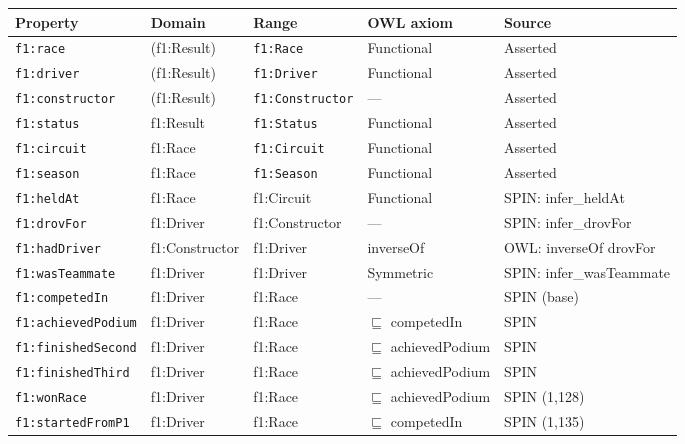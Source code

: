\begin{center}
\begin{tabularx}{\linewidth}{@{}lllp{2.2cm}X@{}}
\toprule
\textbf{Property} & \textbf{Domain} & \textbf{Range} & \textbf{OWL axiom} & \textbf{Source} \\
\midrule
\texttt{f1:race}       & (f1:Result) & \texttt{f1:Race}        & Functional & Asserted \\
\texttt{f1:driver}     & (f1:Result) & \texttt{f1:Driver}      & Functional & Asserted \\
\texttt{f1:constructor}& (f1:Result) & \texttt{f1:Constructor} & ---        & Asserted \\
\texttt{f1:status}     & f1:Result   & \texttt{f1:Status}      & Functional & Asserted \\
\texttt{f1:circuit}    & f1:Race     & \texttt{f1:Circuit}     & Functional & Asserted \\
\texttt{f1:season}     & f1:Race     & \texttt{f1:Season}      & Functional & Asserted \\
\midrule
\texttt{f1:heldAt}          & f1:Race        & f1:Circuit     & Functional        & SPIN: infer\_heldAt \\
\texttt{f1:drovFor}         & f1:Driver      & f1:Constructor & ---               & SPIN: infer\_drovFor \\
\texttt{f1:hadDriver}       & f1:Constructor & f1:Driver      & inverseOf         & OWL: inverseOf drovFor \\
\texttt{f1:wasTeammate}     & f1:Driver      & f1:Driver      & Symmetric         & SPIN: infer\_wasTeammate \\
\texttt{f1:competedIn}      & f1:Driver      & f1:Race        & ---               & SPIN (base) \\
\texttt{f1:achievedPodium}  & f1:Driver      & f1:Race        & $\sqsubseteq$ competedIn & SPIN \\
\texttt{f1:finishedSecond}  & f1:Driver      & f1:Race        & $\sqsubseteq$ achievedPodium & SPIN \\
\texttt{f1:finishedThird}   & f1:Driver      & f1:Race        & $\sqsubseteq$ achievedPodium & SPIN \\
\texttt{f1:wonRace}         & f1:Driver      & f1:Race        & $\sqsubseteq$ achievedPodium & SPIN (1{,}128) \\
\texttt{f1:startedFromP1}   & f1:Driver      & f1:Race        & $\sqsubseteq$ competedIn & SPIN (1{,}135) \\

\end{tabularx}
\end{center}
